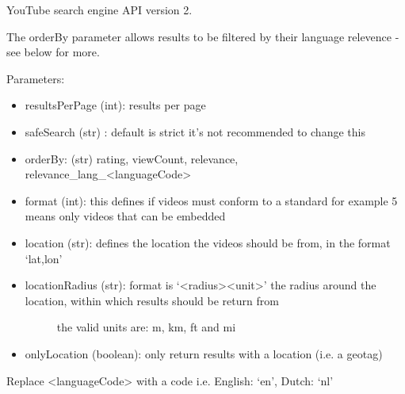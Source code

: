 \documentclass[letterpaper,10pt,english]{sphinxmanual}
\begin{document}
\begin{fulllineitems}
\label{api2.0:puppy.search.engine.YouTubeV2}
YouTube search engine API version 2.

The orderBy parameter allows results to be filtered by their language relevence - see below for more.

Parameters:
\begin{itemize}
\item {} 
resultsPerPage (int): results per page

\item {} 
safeSearch (str) : default is strict it's not recommended to change this

\item {} 
orderBy: (str)  rating, viewCount, relevance, relevance\_lang\_\textless{}languageCode\textgreater{}

\item {} 
format (int): this defines if videos must conform to a standard for example 5 means only videos that can be embedded

\item {} 
location (str): defines the location the videos should be from, in the format `lat,lon'

\item {} \begin{description}
\item[{locationRadius (str): format is `\textless{}radius\textgreater{}\textless{}unit\textgreater{}' the radius around the location, within which results should be return from}] \leavevmode
the valid units are: m, km, ft and mi

\end{description}

\item {} 
onlyLocation (boolean): only return results with a location (i.e. a geotag)

\end{itemize}

Replace \textless{}languageCode\textgreater{} with a code i.e. English: `en', Dutch: `nl'

\end{fulllineitems}
\end{document}
